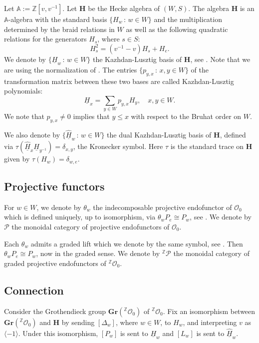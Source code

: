 \documentclass[a4paper]{amsart}
\begin{document}
Let $\mathbb{A}:=\mathbb{Z}[v,v^{-1}]$.
Let $\mathbf{H}$ be the Hecke algebra of $(W,S)$.
The algebra $\mathbf{H}$ is an $\mathbb{A}$-algebra
with the standard basis $\{H_w\,:\,w\in W\}$ and
the multiplication determined by the braid relations
in $W$ as well as the following quadratic relations
for the generators $H_s$, where $s\in S$:
\begin{displaymath}
H_s^2=(v^{-1}-v)H_s+H_e. 
\end{displaymath}
We denote by $\{\underline{H}_w\,:\,w\in W\}$
the Kazhdan-Lusztig basis of $\mathbf{H}$, see \cite{KL}.
Note that we are using the normalization of \cite{So1}.
The entries $\{p_{y,x}\,:\,x,y\in W\}$
of the transformation matrix between these two bases
are called Kazhdan-Lusztig polynomials:
\begin{displaymath}
\underline{H}_x=\sum_{y\in W}p_{y,x}H_y,\quad x,y\in W.
\end{displaymath}
We note that $p_{y,x}\neq 0$ implies that
$y\leq x$ with respect to the Bruhat order on $W$.

We also denote by $\{\underline{\hat{H}}_w\,:\,w\in W\}$
the dual Kazhdan-Lusztig basis of $\mathbf{H}$, defined
via $\tau(\underline{\hat{H}}_x\underline{H}_{y^{-1}})=\delta_{x,y}$,
the Kronecker symbol. Here $\tau$ is the standard trace on $\mathbf{H}$
given by $\tau(H_w)=\delta_{w,e}$.

\subsection{Projective functors}\label{s1.6}

For $w\in W$, we denote by $\theta_w$ the indecomposable projective
endofunctor of $\mathcal{O}_0$ which is defined uniquely, up to 
isomorphism, via $\theta_w P_e\cong P_w$, see \cite{BG}.
We denote by $\mathscr{P}$ the monoidal category of projective
endofunctors of $\mathcal{O}_0$.

Each $\theta_w$ admits a graded lift which we denote by the same
symbol, see \cite{St}. Then $\theta_w P_e\cong P_w$, now in the graded sense.
We denote by ${}^\mathbb{Z}\mathscr{P}$ the monoidal category of 
graded projective endofunctors of ${}^\mathbb{Z}\mathcal{O}_0$.

\subsection{Connection}\label{s1.7}

Consider the Grothendieck group 
$\mathbf{Gr}({}^\mathbb{Z}\mathcal{O}_0)$ of 
${}^\mathbb{Z}\mathcal{O}_0$. Fix an isomorphism between 
$\mathbf{Gr}({}^\mathbb{Z}\mathcal{O}_0)$ and
$\mathbf{H}$ by sending $[\Delta_w]$, where $w\in W$,
to $H_w$, and interpreting $v$ as $\langle -1\rangle$.
Under this isomorphism, $[P_w]$ is sent to 
$\underline{H}_w$ and $[L_w]$ is sent to $\underline{\hat{H}}_w$.
\end{document}
